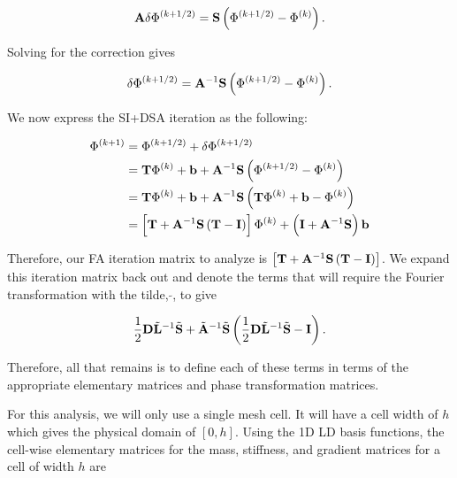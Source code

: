 \begin{equation}
\label{eq::App_DSA_1D_diff_ops}
{\bf A} \delta \Phi^{(k+1/2)} = {\bf S}\left( \Phi^{(k+1/2)} -  \Phi^{(k)}   \right) .
\end{equation}

\noindent Solving for the correction gives

\begin{equation}
\label{eq::App_DSA_1D_diff_corr}
 \delta \Phi^{(k+1/2)} = {\bf A}^{-1} {\bf S}\left( \Phi^{(k+1/2)} -  \Phi^{(k)}   \right) .
\end{equation}

\noindent We now express the SI+DSA iteration as the following:

\begin{equation}
\label{eq::App_DSA_1D_iter}
\begin{aligned}
 \Phi^{(k+1)} &= \Phi^{(k+1/2)} +   \delta \Phi^{(k+1/2)}\\
 &= {\bf T}\Phi^{(k)} + {\bf b} +  {\bf A}^{-1} {\bf S}\left( \Phi^{(k+1/2)} -  \Phi^{(k)}   \right) \\
 &= {\bf T}\Phi^{(k)} + {\bf b} +  {\bf A}^{-1} {\bf S}\left( {\bf T}\Phi^{(k)} + {\bf b} -  \Phi^{(k)}   \right) \\
  &= \left[  {\bf T} + {\bf A}^{-1} {\bf S}\left( {\bf T} -  {\bf I} \right)  \right] \Phi^{(k)} + \left( {\bf I} +  {\bf A}^{-1} {\bf S}  \right){\bf b}
\end{aligned}
\end{equation}

\noindent Therefore, our FA iteration matrix to analyze is $\left[  {\bf T} + {\bf A}^{-1} {\bf S}\left( {\bf T} -  {\bf I} \right)  \right]$. We expand this iteration matrix back out and denote the terms that will require the Fourier transformation with the tilde, $\tilde{}$, to give

\begin{equation}
\label{eq::App_DSA_1D_FA_mat}
\frac{1}{2} {\bf D} \tilde{{\bf L}}^{-1} \tilde{{\bf S}} + \tilde{{\bf A}}^{-1} \tilde{{\bf S}}\left( \frac{1}{2} {\bf D} \tilde{{\bf L}}^{-1} \tilde{{\bf S}} -  {\bf I} \right).
\end{equation}

\noindent Therefore, all that remains is to define each of these terms in terms of the appropriate elementary matrices and phase transformation matrices.

For this analysis, we will only use a single mesh cell. It will have a cell width of $h$ which gives the physical domain of $[0,h]$. Using the 1D LD basis functions, the cell-wise elementary matrices for the mass, stiffness, and gradient matrices for a cell of width $h$ are

